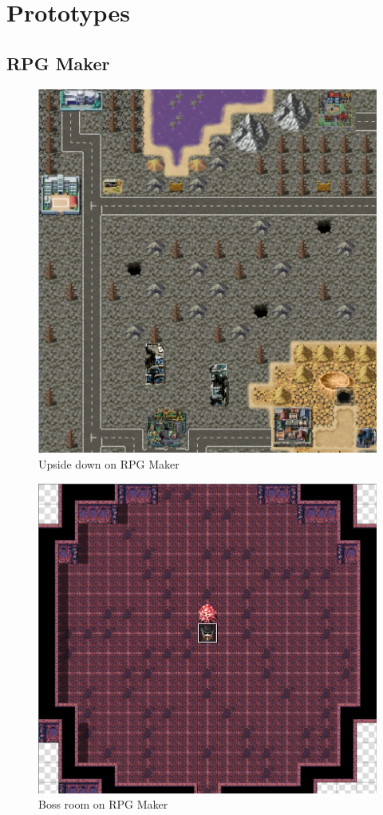 \section{Prototypes}

\subsection{RPG Maker}
\begin{figure}[H]
	\centering
	\includegraphics[width=14cm]{images/rpg_maker/rpg_upsidedown.png}
	\caption*{Upside down on RPG Maker}
\end{figure}
\vspace*{3cm}
\begin{figure}[H]
	\centering
	\includegraphics[width=14cm]{images/rpg_maker/rpg_bossroom.png}
	\caption*{Boss room on RPG Maker}
\end{figure}


